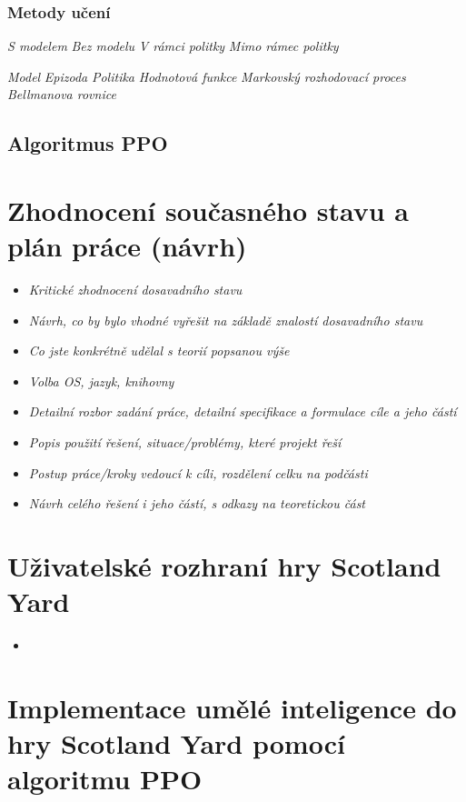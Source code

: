 \subsection*{Metody učení}
\emph{S modelem}
\emph{Bez modelu}
\emph{V rámci politky}
\emph{Mimo rámec politky}

\emph{Model}
\emph{Epizoda}
\emph{Politika}
\emph{Hodnotová funkce}
\emph{Markovský rozhodovací proces}
\emph{Bellmanova rovnice}
\section{Algoritmus PPO}

\chapter{Zhodnocení současného stavu a plán práce (návrh)}
\label{navrh}
\begin{itemize}
  \item \emph {Kritické zhodnocení dosavadního stavu}
  \item \emph {Návrh, co by bylo vhodné vyřešit na základě znalostí dosavadního stavu}
  \item \emph {Co jste konkrétně udělal s teorií popsanou výše}
  \item \emph {Volba OS, jazyk, knihovny}
  \item \emph {Detailní rozbor zadání práce, detailní specifikace a formulace cíle a jeho částí}
  \item \emph {Popis použití řešení, situace/problémy, které projekt řeší}
  \item \emph {Postup práce/kroky vedoucí k cíli, rozdělení celku na podčásti}
  \item \emph {Návrh celého řešení i jeho částí, s odkazy na teoretickou část}
\end{itemize}

\chapter{Uživatelské rozhraní hry Scotland Yard}
\label{rozhrani}

\begin{itemize}
  \item \emph {}
\end{itemize}

\chapter{Implementace umělé inteligence do hry Scotland Yard pomocí algoritmu PPO}
\label{implementace}

